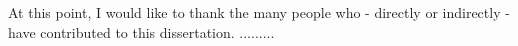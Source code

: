 
\begin{romanpages}

\begin{copyrightpage}
\end{copyrightpage}

\begin{approvalpage}
\end{approvalpage}


\begin{acknowledgementpage}
At this point, I would like to thank the many people who - directly or indirectly - have contributed
to this dissertation. .........\\
\end{acknowledgementpage}


\begin{contentpage}
  \begin{flushleft}
  \end{flushleft}
  \tableofcontents
  \begin{flushleft}
  \end{flushleft}
\end{contentpage}



\end{romanpages}
